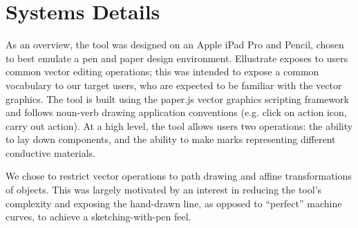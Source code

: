 \documentclass{sigchi}
\begin{document}
\section{Systems Details}


    As an overview, the tool was designed on an Apple iPad Pro and Pencil, chosen to best emulate a pen and paper design environment.  Ellustrate exposes to users common vector editing operations; this was intended to expose a common vocabulary to our target users, who are expected to be familiar with the vector graphics. The tool is built using the paper.js vector graphics scripting framework~\cite{lehni_paperjs_2011} and follows noun-verb drawing application conventions (e.g. click on action icon, carry out action). At a high level, the tool allows users two operations: the ability to lay down components, and the ability to make marks representing different conductive materials.

    We chose to restrict vector operations to path drawing and affine transformations of objects. This was largely motivated by an interest in reducing the tool's complexity and exposing the hand-drawn line, as opposed to ``perfect'' machine curves, to achieve a sketching-with-pen feel.
\end{document}
